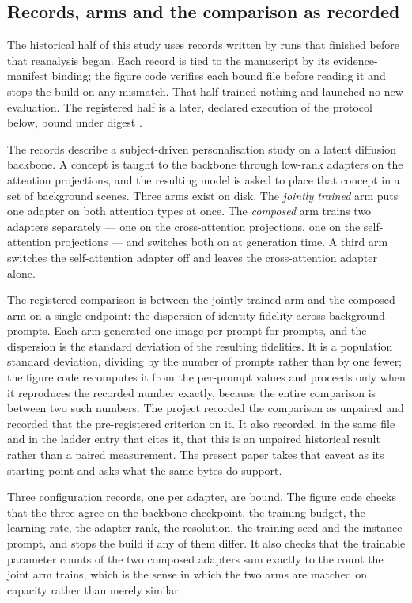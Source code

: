 \subsection{Records, arms and the comparison as recorded}

The historical half of this study uses records written by runs that finished
before that reanalysis began. Each record is tied to the manuscript by its
evidence-manifest binding; the figure code verifies each bound file before
reading it and stops the build on any mismatch. That half trained nothing and
launched no new evaluation. The registered half is a later, declared execution
of the protocol below, bound under digest \PredeclarationShaShort{}.

The records describe a subject-driven personalisation study on a latent
diffusion backbone. A concept is taught to the backbone through low-rank
adapters on the attention projections, and the resulting model is asked to
place that concept in a set of background scenes. Three arms exist on disk. The
\emph{jointly trained} arm puts one adapter on both attention types at once.
The \emph{composed} arm trains two adapters separately --- one on the
cross-attention projections, one on the self-attention projections --- and
switches both on at generation time. A third arm switches the self-attention
adapter off and leaves the cross-attention adapter alone.

The registered comparison is between the jointly trained arm and the composed
arm on a single endpoint: the dispersion of identity fidelity across background
prompts. Each arm generated one image per prompt for \NPairs{} prompts, and the
dispersion is the standard deviation of the \NPairs{} resulting fidelities.
It is a population standard deviation, dividing by the number of prompts rather
than by one fewer; the figure code recomputes it from the per-prompt values and
proceeds only when it reproduces the recorded number exactly, because the
entire comparison is between two such numbers. The project recorded the
comparison as unpaired and recorded that the pre-registered criterion
\KillFires{} on it. It also recorded, in the same file and in the ladder entry
that cites it, that this is an unpaired historical result rather than a paired
measurement. The present paper takes that caveat as its starting point and asks
what the same bytes do support.

Three configuration records, one per adapter, are bound. The figure code
checks that the three agree on the backbone checkpoint, the training budget,
the learning rate, the adapter rank, the resolution, the training seed and the
instance prompt, and stops the build if any of them differ. It also checks
that the trainable parameter counts of the two composed adapters sum exactly to
the count the joint arm trains, which is the sense in which the two arms are
matched on capacity rather than merely similar.

